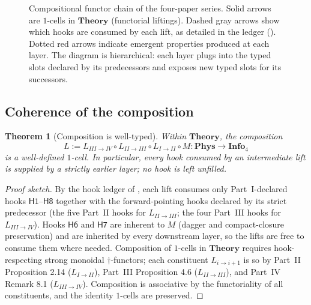 \documentclass[12pt]{article}
\newtheorem{theorem}{Theorem}[section]
\theoremstyle{definition}
\theoremstyle{remark}
\newcommand{\Phys}{\mathbf{Phys}}
\newcommand{\Info}{\mathbf{Info}}
\newcommand{\Theory}{\mathbf{Theory}}
\begin{document}
\begin{figure}[ht]
\caption{Compositional functor chain of the four-paper series. Solid
arrows are $1$-cells in $\Theory$ (functorial liftings). Dashed gray
arrows show which hooks are consumed by each lift, as detailed in the
ledger (). Dotted red arrows indicate emergent
properties produced at each layer. The diagram is hierarchical: each
layer plugs into the typed slots declared by its predecessors and
exposes new typed slots for its successors.}
\label{fig:main-diagram}
\end{figure}

\subsection{Coherence of the composition}

\begin{theorem}[Composition is well-typed]
\label{thm:composition}
Within $\Theory$, the composition
\[
L := L_{III \to IV} \circ L_{II \to III} \circ L_{I \to II} \circ M : \Phys
\to \Info_4
\]
is a well-defined $1$-cell. In particular, every hook consumed by an
intermediate lift is supplied by a strictly earlier layer; no hook is left
unfilled.
\end{theorem}

\begin{proof}[Proof sketch]
By the hook ledger of , each lift consumes only
Part~I-declared hooks $\mathsf{H1}$--$\mathsf{H8}$ together with the
forward-pointing hooks declared by its strict predecessor (the five
Part~II hooks for $L_{II\to III}$; the four Part~III hooks for
$L_{III\to IV}$). Hooks $\mathsf{H6}$ and $\mathsf{H7}$ are inherent to
$M$ (dagger and compact-closure preservation) and are inherited by every
downstream layer, so the lifts are free to consume them where needed.
Composition of $1$-cells in $\Theory$ requires hook-respecting strong
monoidal $\dagger$-functors; each constituent $L_{i\to i+1}$ is so by
Part~II Proposition 2.14 ($L_{I\to II}$), Part~III Proposition 4.6
($L_{II\to III}$), and Part~IV Remark 8.1 ($L_{III\to IV}$). Composition
is associative by the functoriality of all constituents, and the
identity $1$-cells are preserved.
\end{proof}
\end{document}
